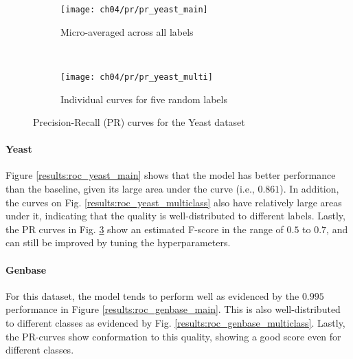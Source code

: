 \begin{figure}[t]
    \centering
    \begin{subfigure}[b]{0.45\textwidth}
        \texttt{[image: ch04/pr/pr\_yeast\_main]}
        \caption{Micro-averaged across all labels}
        \label{results:pr_yeast_main}
    \end{subfigure}
    ~ %
    \begin{subfigure}[b]{0.45\textwidth}
        \texttt{[image: ch04/pr/pr\_yeast\_multi]}
        \caption{Individual curves for five random labels}
        \label{results:pr_yeast_multi}
    \end{subfigure}
    \caption{Precision-Recall (PR) curves for the Yeast dataset}
    \label{results:pr_yeast}
\end{figure}

\paragraph{Yeast} Figure \ref{results:roc_yeast_main} shows that the model has
better performance than the baseline, given its large area under the curve
(i.e., $0.861$). In addition, the curves on Fig.
\ref{results:roc_yeast_multiclass} also have relatively large areas under it,
indicating that the quality is well-distributed to different labels. Lastly,
the PR curves in Fig.  \ref{results:pr_yeast} show an estimated F-score in the
range of $0.5$ to $0.7$, and can still be improved by tuning the
hyperparameters.

\paragraph{Genbase} For this dataset, the model tends to perform well as
evidenced by the $0.995$ performance in Figure \ref{results:roc_genbase_main}.
This is also well-distributed to different classes as evidenced by Fig.
\ref{results:roc_genbase_multiclass}. Lastly, the PR-curves show conformation to
this quality, showing a good score even for different classes.  \\ 


